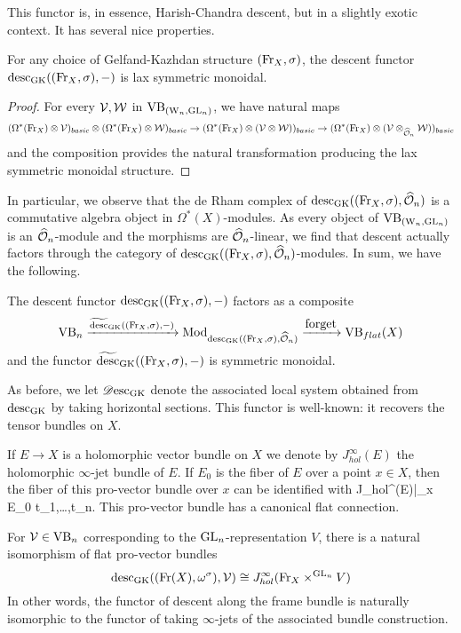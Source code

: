 This functor is, in essence, Harish-Chandra descent, but in a slightly exotic context.
It has several nice properties.

\begin{lemma}\label{prop lax}
For any choice of Gelfand-Kazhdan structure $({\rm Fr}_X,\sigma)$, the descent functor ${\rm desc}_{\rm GK}(({\rm Fr}_X,\sigma),-)$ is lax symmetric monoidal.
\end{lemma}

\begin{proof}
For every $\mathcal{V},\mathcal{W}$ in ${\rm VB}_{({{\rm W}_n}, {\rm GL}_n)}$, we have natural maps
\[
(\Omega^*({\rm Fr}_X) \otimes \mathcal{V})_{basic} \otimes (\Omega^*({\rm Fr}_X) \otimes \mathcal{W})_{basic} \to (\Omega^*({\rm Fr}_X) \otimes (\mathcal{V} \otimes \mathcal{W}))_{basic} \to (\Omega^*({\rm Fr}_X) \otimes (\mathcal{V} \otimes_{\widehat{\mathcal O}_n} \mathcal{W}))_{basic}
\]
and the composition provides the natural transformation producing the lax symmetric monoidal structure.
\end{proof}

In particular, we observe that the de Rham complex of ${\rm desc}_{\rm GK}(({\rm Fr}_X,\sigma),\widehat{\mathcal O}_n)$ is a commutative algebra object in $\Omega^*(X)$-modules. 
As every object of ${\rm VB}_{({{\rm W}_n}, {\rm GL}_n)}$ is an $\widehat{\mathcal O}_n$-module and the morphisms are $\widehat{\mathcal O}_n$-linear, 
we find that descent actually factors through the category of ${\rm desc}_{\rm GK}(({\rm Fr}_X,\sigma),\widehat{\mathcal O}_n)$-modules. 
In sum, we have the following.

\begin{lemma}
The descent functor ${\rm desc}_{\rm GK}(({\rm Fr}_X,\sigma),-)$ factors as a composite
\[
\VB_n \xto{\widetilde{\desc}_\GK((\Fr_X,\sigma),-)} \Mod_{\desc_\GK((\Fr_X,\sigma),\hO_n)} \xto{\txt{forget}} \VB_{flat}(X)
\]
and the functor $\widetilde{{\rm desc}}_{\rm GK}(({\rm Fr}_X,\sigma),-)$ is symmetric monoidal.
\end{lemma}

As before, we let $\mathscr{D}{\rm esc}_{{\rm GK}}$ denote the associated local system
obtained from ${\rm desc}_{{\rm GK}}$ by taking horizontal sections. This
functor is well-known: it recovers the tensor bundles on $X$.

If $E \to X$ is a holomorphic vector bundle on $X$ we denote by
$J_{hol}^\infty(E)$ the holomorphic $\infty$-jet bundle of $E$. If
$E_0$ is the fiber of $E$ over a point $x \in X$, then the fiber of
this pro-vector bundle over $x$ can be identified with
\ben
J_{hol}^\infty (E)|_{x} \cong E_0 \times \CC \ll t_1,\ldots,t_n\rr .
\een
This pro-vector bundle has a canonical flat connection.

\begin{prop}
For $\mathcal{V} \in {\rm VB}_n$ corresponding to the ${\rm GL}_n$-representation $V$,
there is a natural isomorphism of flat pro-vector bundles
\[
{\rm desc}_{\rm GK}(({\rm Fr}(X),\omega^\sigma),\mathcal{V}) \cong J_{hol}^\infty({\rm Fr}_X
\times^{{\rm GL}_n} V)
\]
In other words, the functor of descent along the frame bundle is
naturally isomorphic to the functor of taking $\infty$-jets of the associated bundle construction.
\end{prop} 

